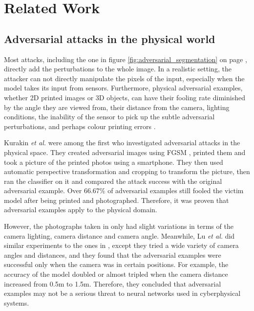 \section{Related Work}
\subsection{Adversarial attacks in the physical world}
    \label{subsec:physical_attacks_challenges}

Most attacks, including the one in figure \ref{fig:adversarial_segmentation} on page \pageref{fig:adversarial_segmentation}, directly add the perturbations to the whole image. In a realistic setting, the attacker can not directly manipulate the pixels of the input, especially when the model takes its input from sensors. Furthermore, physical adversarial examples, whether 2D printed images or 3D objects, can have their fooling rate diminished by the angle they are viewed from, their distance from the camera, lighting conditions, the inability of the sensor to pick up the subtle adversarial perturbations, and perhaps colour printing errors \cite{kurakin2016adversarial, athalye, evtimov_road_signs}.

Kurakin \textit{et al.} \cite{kurakin2016adversarial} were among the first who investigated adversarial attacks in the physical space. They created adversarial images using FGSM \cite{fgsm}, printed them and took a picture of the printed photos using a smartphone. They then used automatic perspective transformation and cropping to transform the picture, then ran the classifier on it and compared the attack success with the original adversarial example. Over 66.67\% of adversarial examples still fooled the victim model after being printed and photographed. Therefore, it was proven that adversarial examples apply to the physical domain.

However, the photographs taken in \cite{kurakin2016adversarial} only had slight variations in terms of the camera lighting, camera distance and camera angle. Meanwhile, Lu \textit{et al.} \cite{lu_physical_experiments} did similar experiments to the ones in \cite{kurakin2016adversarial}, except they tried a wide variety of camera angles and distances, and they found that the adversarial examples were successful only when the camera was in certain positions. For example, the accuracy of the model doubled or almost tripled when the camera distance increased from 0.5m to 1.5m. Therefore, they concluded that adversarial examples may not be a serious threat to neural networks used in cyberphysical systems.

